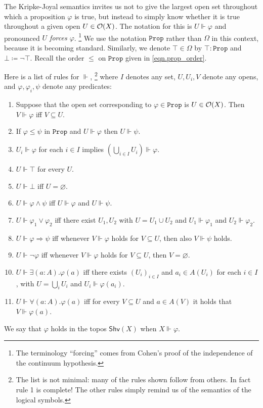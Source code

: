 \documentclass[11pt, oneside, article]{memoir}
\theoremstyle{plain}
\theoremstyle{definition}
\theoremstyle{remark}
\renewcommand{\ss}{\subseteq}
\newcommand{\const}[1]{\mathtt{#1}}
\newcommand{\Fun}[1]{\mathsf{#1}}
\newcommand{\forces}{\Vdash}
\newcommand{\shv}{\Fun{Shv}}
\newcommand{\prop}{\const{Prop}}
\newcommand{\Op}[1][undef]{\ifthenelse{\equal{#1}{undef}}{\mathcal{O}}{\mathcal{O}(#1)}}
\newcommand{\imp}{\Rightarrow}
\newcommand{\true}{\top}
\newcommand{\false}{\bot}
\begin{document}
The Kripke-Joyal semantics invites us not to give the largest open set throughout which a proposition $\varphi$ is true, but instead to simply know whether it is true throughout a given open $U\in\Op[X]$. The notation for this is $U\forces\varphi$ and pronounced \emph{$U$ forces $\varphi$}.%
\footnote{The terminology ``forcing'' comes from Cohen's proof of the independence of the continuum hypothesis.}
We use the notation $\prop$ rather than $\Omega$ in this context, because it is becoming standard. Similarly, we denote $\top\in\Omega$ by $\true:\prop$ and $\false\coloneqq\neg\true$. Recall the order $\leq$ on $\prop$ given in \eqref{eqn.prop_order}.

Here is a list of rules for $\forces$,%
\footnote{The list is not minimal: many of the rules shown follow from others. In fact rule 1 is complete! The other rules simply remind us of the semantics of the logical symbols.
}
where $I$ denotes any set, $U, U_i, V$ denote any opens, and $\varphi,\varphi_i,\psi$ denote any predicates:
\begin{enumerate}
	\item Suppose that the open set corresponding to $\varphi\in\prop$ is $U\in\Op[X]$. Then $V\forces\varphi$ iff $V\ss U$.
  \item If $\varphi\leq\psi$ in $\prop$ and $U\forces\varphi$ then $U\forces\psi$.
  \item $U_i\forces\varphi$ for each $i\in I$ implies $\left(\bigcup_{i\in I}U_i\right)\forces\varphi$.
  \item $U\forces\true$ for every $U$.
  \item $U\forces\false$ iff $U=\varnothing$.
  \item $U\forces\varphi\wedge\psi$ iff $U\forces\varphi$ and $U\forces\psi$.
  \item $U\forces\varphi_1\vee\varphi_2$ iff there exist $U_1,U_2$ with $U=U_1\cup U_2$ and $U_1\forces\varphi_1$ and $U_2\forces\varphi_2$.
  \item $U\forces \varphi\imp\psi$ iff whenever $V\forces\varphi$ holds for $V\ss U$, then also $V\forces\psi$ holds.
  \item $U\forces\neg\varphi$ iff whenever $V\forces\varphi$ holds for $V\ss U$, then $V=\varnothing$.
  \item $U\forces\exists (a:A).\varphi(a)$ iff there exists $(U_i)_{i\in I}$ and $a_i\in A(U_i)$ for each $i\in I$, with $U=\bigcup_iU_i$ and $U_i\forces\varphi(a_i)$.
  \item $U\forces\forall (a:A).\varphi(a)$ iff for every $V\ss U$ and $a\in A(V)$ it holds that $V\forces \varphi(a)$.
\end{enumerate}
We say that $\varphi$ holds in the topos $\shv(X)$ when $X\forces\varphi$.
\end{document}
